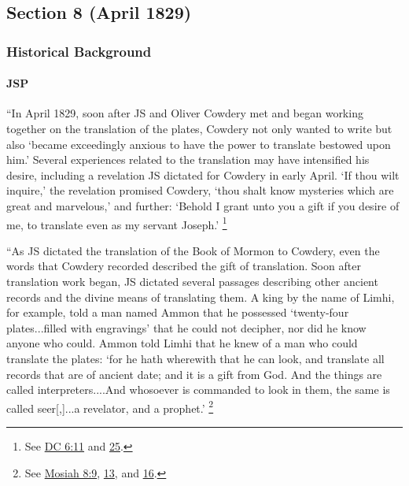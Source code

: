 \subsection{Section 8 (April 1829)}
	\label{DC8}
	
	\subsubsection{Historical Background}
		\label{DC8-HB}
		
		\paragraph{JSP}
		
			``In April 1829, soon after JS and Oliver Cowdery met and began working together on the translation of the plates, Cowdery not only wanted to write but also `became exceedingly anxious to have the power to translate bestowed upon him.' Several experiences related to the translation may have intensified his desire, including a revelation JS dictated for Cowdery in early April. `If thou wilt inquire,' the revelation promised Cowdery, `thou shalt know mysteries which are great and marvelous,' and further: `Behold I grant unto you a gift if you desire of me, to translate even as my servant Joseph.'%
				\footnote{%
					See \hyperref[DC6-11]{DC 6:11} and \hyperref[DC6-25]{25}.
					}
			
			``As JS dictated the translation of the Book of Mormon to Cowdery, even the words that Cowdery recorded described the gift of translation. Soon after translation work began, JS dictated several passages describing other ancient records and the divine means of translating them. A king by the name of Limhi, for example, told a man named Ammon that he possessed `twenty-four plates...filled with engravings' that he could not decipher, nor did he know anyone who could. Ammon told Limhi that he knew of a man who could translate the plates: `for he hath wherewith that he can look, and translate all records that are of ancient date; and it is a gift from God. And the things are called interpreters....And whosoever is commanded to look in them, the same is called seer[,]...a revelator, and a prophet.'%
				\footnote{%
					See \hyperref[MOSIAH-8-9]{Mosiah 8:9}, \hyperref[MOSIAH-8-13]{13}, and \hyperref[MOSIAH-8-16]{16}.
					}
			
